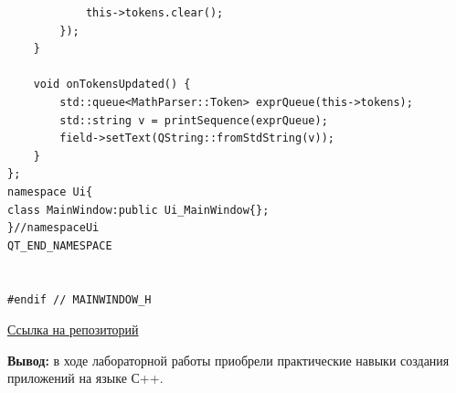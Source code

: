 \documentclass[a4paper,14pt]{extarticle}
\begin{document}
\begin{verbatim}
            this->tokens.clear();
        });
    }

    void onTokensUpdated() {
        std::queue<MathParser::Token> exprQueue(this->tokens);
        std::string v = printSequence(exprQueue);
        field->setText(QString::fromStdString(v));
    }
};
namespace Ui{
class MainWindow:public Ui_MainWindow{};
}//namespaceUi
QT_END_NAMESPACE


#endif // MAINWINDOW_H
\end{verbatim}

\href{https://gitlab.com/vlad4052/2024_pv223_vladislav_10}{Ссылка на репозиторий}

\textbf{Вывод: } в ходе лабораторной работы приобрели практические навыки создания приложений на
языке С++.
\end{document}
